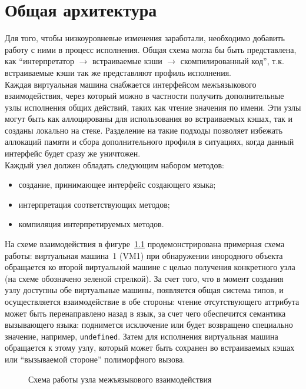 \documentclass[times,specification,annotation]{itmo-student-thesis}
\begin{document}
\chapter{Общая архитектура}\label{ch:architecture}
Для того, чтобы низкоуровневые изменения заработали, необходимо добавить работу с ними в процесс исполнения. Общая схема могла бы быть представлена, как ``интерпретатор $\rightarrow$ встраиваемые кэши $\rightarrow$ скомпилированный код'', т.к. встраиваемые кэши так же представляют профиль исполнения.\\
Каждая виртуальная машина снабжается интерфейсом межъязыкового взаимодействия, через который можно в частности получить дополнительные узлы исполнения общих действий, таких как чтение значения по имени. Эти узлы могут быть как аллоцированы для использования во встраиваемых кэшах, так и созданы локально на стеке. Разделение на такие подходы позволяет избежать аллокаций памяти и сбора дополнительного профиля в ситуациях, когда данный интерфейс будет сразу же уничтожен.\\
Каждый узел должен обладать следующим набором методов:
\begin{itemize}
	\item создание, принимающее интерфейс создающего языка;
	\item интерпретация соответствующих методов;
	\item компиляция интерпретируемых методов.
\end{itemize}
На схеме взаимодействия в фигуре~\ref{fig:create-interop-node} продемонстрирована примерная схема работы: виртуальная машина~1 (VM1) при обнаружении инородного объекта обращается ко второй виртуальной машине с целью получения конкретного узла (на схеме обозначено зеленой стрелкой). За счет того, что в момент создания узлу доступны обе виртуальные машины, появляется общая система типов, и осуществляется взаимодействие в обе стороны: чтение отсутствующего аттрибута может быть перенаправлено назад в язык, за счет чего обеспечится семантика вызывающего языка: поднимется исключение или будет возвращено специально значение, например, \texttt{undefined}. Затем для исполнения виртуальная машина обращается к этому узлу, который может быть сохранен во встраиваемых кэшах или ``вызываемой стороне'' полиморфного вызова.
\begin{figure}[!h]
	\caption{Схема работы узла межъязыкового взаимодействия}\label{fig:create-interop-node}
	\centering
	
\end{figure}
\end{document}
